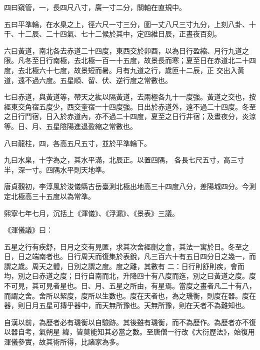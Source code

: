 \begin{pinyinscope}
 四曰窺管，一，長四尺八寸，廣一寸二分，關軸在直規中。



 五曰平準輪，在水臬之上，徑六尺一寸三分，圍一丈八尺三寸九分，上刻八卦、十干、十二辰、二十四氣、七十二候於其中，定四維日辰，正晝夜百刻。



 六曰黃道，南北各去赤道二十四度，東西交於卯酉，以為日行盈縮、月行九道之限。凡冬至日行南極，去北極一百一十五度，故景長而寒；夏至日在赤道北二十四度，去北極六十七度，故景短而暑。月有九道之行，歲匝十二辰，正
 交出入黃道，遠不過六度。五星順、留、伏、逆行度之常數也。



 七曰赤道，與黃道等，帶天之紘以隔黃道，去兩極各九十一度強。黃道之交也，按經東交角宿五度少，西交奎宿一十四度強。日出於赤道外，遠不過二十四度。冬至之日行鬥宿，日入於赤道內，亦不過二十四度，夏至之日行井宿；及晝夜分，炎涼等。日、月、五星陰陽進退盈縮之常數也。



 八曰龍柱，四，各高五尺五寸，並於平準輪下。



 九曰水臬，十字為之，其水平滿，北辰正。以置四隅，
 各長七尺五寸，高三寸半，深一寸。四隅水平則天地準。



 唐貞觀初，李淳風於浚儀縣古岳臺測北極出地高三十四度八分，差陽城四分。今測定北極高三十五度以為常準。



 熙寧七年七月，沉括上《渾儀》、《浮漏》、《景表》三議。



 《渾儀議》曰：



 五星之行有疾舒，日月之交有見匿，求其次舍經劘之會，其法一寓於日。冬至之日，日之端南者也。日行周天而復集於表銳，凡三百六十有五日四分日之幾一，而謂之歲。周天之體，日別之謂之度。度之離，其數有
 二：日行則舒則疾，會而均，別之曰赤道之度；日行自南而北，升降四十有八度而迤，別之曰黃道之度。度不可見，其可見者星也。日、月、五星之所由，有星焉。當度之畫者凡二十有八，而謂之舍。舍所以絜度，度所以生數也。度在天者也，為之璣衡，則度在器。度在器，則日月五星可摶乎器中，而天無所豫也。天無所豫，則在天者不為難知也。



 自漢以前，為歷者必有璣衡以自驗跡。其後雖有璣衡，而不為歷作。為歷者亦不復以器自考，氣朔星
 緯，皆莫能知其必當之數。至唐僧一行改《大衍歷法》，始復用渾儀參實，故其術所得，比諸家為多。




\end{pinyinscope}
